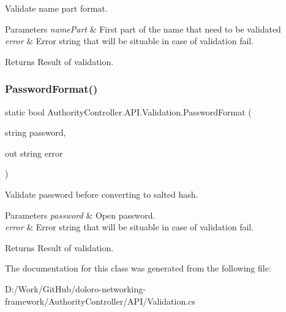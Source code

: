 Validate name part format. 


\begin{DoxyParams}{Parameters}
{\em name\+Part} & First part of the name that need to be validated\\
\hline
{\em error} & Error string that will be situable in case of validation fail.\\
\hline
\end{DoxyParams}
\begin{DoxyReturn}{Returns}
Result of validation.
\end{DoxyReturn}
\mbox{\label{class_authority_controller_1_1_a_p_i_1_1_validation_a9aceff242f489e5d63808e28b1506487}} 
\subsubsection{\texorpdfstring{Password\+Format()}{PasswordFormat()}}
{\footnotesize\ttfamily static bool Authority\+Controller.\+A\+P\+I.\+Validation.\+Password\+Format (\begin{DoxyParamCaption}\item[{string}]{password,  }\item[{out string}]{error }\end{DoxyParamCaption})\hspace{0.3cm}{\ttfamily [static]}}



Validate password before converting to salted hash. 


\begin{DoxyParams}{Parameters}
{\em password} & Open password.\\
\hline
{\em error} & Error string that will be situable in case of validation fail.\\
\hline
\end{DoxyParams}
\begin{DoxyReturn}{Returns}
Result of validation.
\end{DoxyReturn}


The documentation for this class was generated from the following file\+:\begin{DoxyCompactItemize}
\item 
D\+:/\+Work/\+Git\+Hub/doloro-\/networking-\/framework/\+Authority\+Controller/\+A\+P\+I/Validation.\+cs\end{DoxyCompactItemize}
